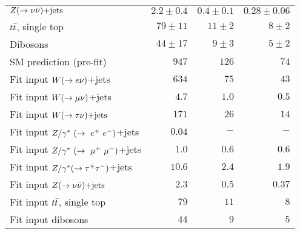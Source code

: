 \begin{table}[!ht]
\begin{center}
\begin{small}
\begin{tabular*}{\textwidth}{@{\extracolsep{\fill}}lrrr}
    $Z(\rightarrow \nu \bar{\nu})\text{+jets}$                             & $2.2 \pm 0.4$         & $0.4 \pm 0.1$&  $0.28 \pm 0.06$\\
                                                                                                
    $t\bar{t}$, single top               & $79 \pm 11$           & $11 \pm 2$   &  $8 \pm 2$      \\
                                                                                                
    Dibosons                           & $44 \pm 17$           & $9 \pm 3$    &  $5 \pm 2$      \\

    \hline

    SM prediction (pre-fit)                 & $947$  & $126$  & $74$  \\                      
    \hline                                                      
                                                                        
    Fit input $W(\rightarrow e \nu)$+jets                  & $634$  & $75$   & $43$  \\
    Fit input $W(\rightarrow \mu \nu)$+jets                  & $4.7$    & $1.0$    & $0.5$   \\
    Fit input $W(\rightarrow \tau \nu)\text{+jets}$                  & $171$  & $26$   & $14$  \\
    Fit input $Z/\gamma^*~(\rightarrow~e^+~e^-)$+jets                  & $0.04$    & $-$    & $-$   \\
    Fit input $Z/\gamma^*~(\rightarrow~\mu^+~\mu^-)$+jets                  & $1.0$    & $0.6$    & $0.6$   \\
    Fit input $Z/\gamma^*(\rightarrow \tau^+ \tau^-)$+jets                  & $10.6$   & $2.4$    & $1.9$   \\
    Fit input $Z(\rightarrow \nu \bar{\nu})\text{+jets}$                  & $2.3$    & $0.5$    & $0.37$   \\
    Fit input $t\bar{t}$, single top    & $79$   & $11$   & $8$   \\
    Fit input dibosons                & $44$   & $9$    & $5$   \\


\end{tabular*}
\end{small}
\end{center}
\end{table}
